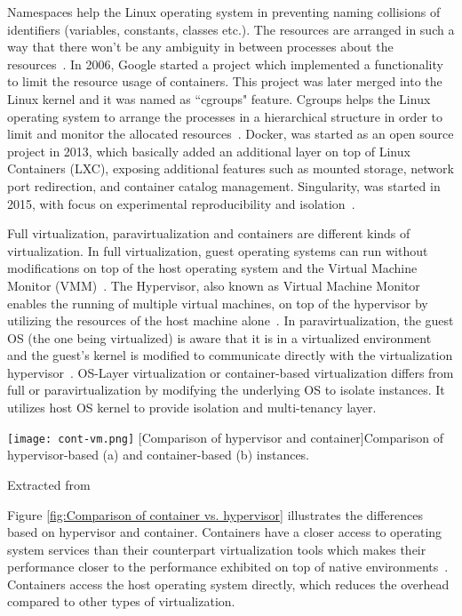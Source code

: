 Namespaces help the Linux operating system in preventing naming collisions of identifiers (variables, constants, classes etc.). The resources are arranged in such a way that there won't be any ambiguity in between processes about the resources~\cite{namespaces}. In 2006, Google started a project which implemented a functionality to limit the resource usage of containers. This project was later merged into the Linux kernel and it was named as ``cgroups" feature. Cgroups helps the Linux operating system to arrange the processes in a hierarchical structure in order to limit and monitor the allocated resources~\cite{cgroups}. Docker, was started as an open source project in 2013, which basically added an additional layer on top of Linux Containers (LXC), exposing additional features such as mounted storage, network port redirection, and container catalog management. Singularity, was started in 2015, with focus on experimental reproducibility and isolation~\cite{Xavier:2013:PEC:2497369.2497577}.

Full virtualization, paravirtualization and containers are different 
kinds of virtualization. In full virtualization, guest operating 
systems can run without modifications on top of the host operating 
system and the Virtual Machine Monitor (VMM)~\cite{7382987}. 
The Hypervisor, also known as Virtual Machine Monitor enables the running of multiple
virtual machines, on top of the hypervisor by utilizing the resources of the host machine alone~\cite{hypervisor}. In paravirtualization, 
the guest OS (the one being virtualized) is aware that it is in a 
virtualized environment and the guest's kernel is modified to 
communicate directly with the virtualization hypervisor~\cite{7382987}. 
OS-Layer virtualization or container-based virtualization differs from 
full or paravirtualization by modifying the underlying OS to isolate 
instances. It utilizes host OS kernel to provide isolation and 
multi-tenancy layer.
\begin{center}
\texttt{[image: cont-vm.png]}
  [Comparison of hypervisor and container]{Comparison of hypervisor-based (a) and container-based (b) instances.}
\label{fig:Comparison of container vs. hypervisor}
\caption*{Extracted from \cite{7382987}}
\end{center}

Figure \ref{fig:Comparison of container vs. hypervisor} illustrates the differences based on hypervisor and container. Containers have a closer access to operating system services than their counterpart virtualization tools which makes their performance closer to the performance exhibited on top of native environments~\cite{Xavier:2013:PEC:2497369.2497577}. Containers access the host operating system directly, which reduces the overhead compared to other types of virtualization.

